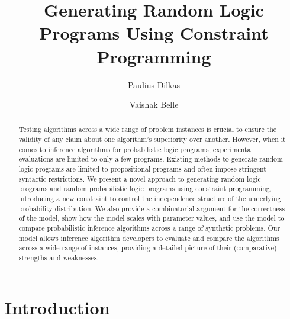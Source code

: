 \documentclass[runningheads]{llncs}
\begin{document}
\title{Generating Random Logic Programs Using Constraint Programming}
\author{Paulius Dilkas \and
Vaishak Belle}

\maketitle

\begin{abstract}
  Testing algorithms across a wide range of problem instances is crucial to
  ensure the validity of any claim about one algorithm's superiority over
  another. However, when it comes to inference algorithms for probabilistic
  logic programs, experimental evaluations are limited to only a few programs.
  Existing methods to generate random logic programs are limited to
  propositional programs and often impose stringent syntactic restrictions. We
  present a novel approach to generating random logic programs and random
  probabilistic logic programs using constraint programming, introducing a new
  constraint to control the independence structure of the underlying probability
  distribution. We also provide a combinatorial argument for the correctness of
  the model, show how the model scales with parameter values, and use the model
  to compare probabilistic inference algorithms across a range of synthetic
  problems. Our model allows inference algorithm developers to evaluate and
  compare the algorithms across a wide range of instances, providing a detailed
  picture of their (comparative) strengths and weaknesses.

\end{abstract}

\section{Introduction}
\end{document}
